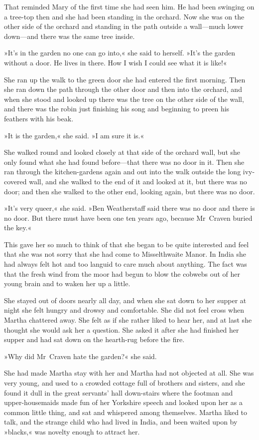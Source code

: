 That reminded Mary of the first time she had seen him. He had been swinging on a tree-top then and she had been standing in the orchard. Now she was on the other side of the orchard and standing in the path outside a wall—much lower down—and there was the same tree inside.

»It's in the garden no one can go into,« she said to herself. »It's the garden without a door. He lives in there. How I wish I could see what it is like!«

She ran up the walk to the green door she had entered the first morning. Then she ran down the path through the other door and then into the orchard, and when she stood and looked up there was the tree on the other side of the wall, and there was the robin just finishing his song and beginning to preen his feathers with his beak.

»It is the garden,« she said. »I am sure it is.«

She walked round and looked closely at that side of the orchard wall, but she only found what she had found before—that there was no door in it. Then she ran through the kitchen-gardens again and out into the walk outside the long ivy-covered wall, and she walked to the end of it and looked at it, but there was no door; and then she walked to the other end, looking again, but there was no door.

»It's very queer,« she said. »Ben Weatherstaff said there was no door and there is no door. But there must have been one ten years ago, because Mr~Craven buried the key.«

This gave her so much to think of that she began to be quite interested and feel that she was not sorry that she had come to Misselthwaite Manor. In India she had always felt hot and too languid to care much about anything. The fact was that the fresh wind from the moor had begun to blow the cobwebs out of her young brain and to waken her up a little.

She stayed out of doors nearly all day, and when she sat down to her supper at night she felt hungry and drowsy and comfortable. She did not feel cross when Martha chattered away. She felt as if she rather liked to hear her, and at last she thought she would ask her a question. She asked it after she had finished her supper and had sat down on the hearth-rug before the fire.

»Why did Mr~Craven hate the garden?« she said.

She had made Martha stay with her and Martha had not objected at all. She was very young, and used to a crowded cottage full of brothers and sisters, and she found it dull in the great servants' hall down-stairs where the footman and upper-housemaids made fun of her Yorkshire speech and looked upon her as a common little thing, and sat and whispered among themselves. Martha liked to talk, and the strange child who had lived in India, and been waited upon by »blacks,« was novelty enough to attract her.

